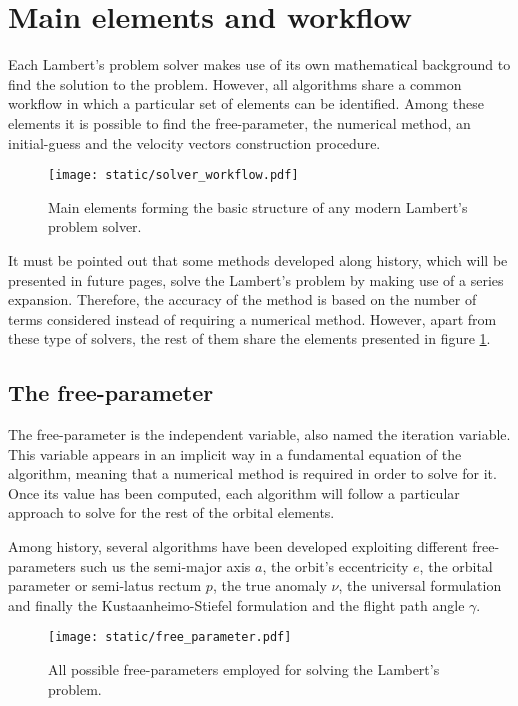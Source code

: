 \section{Main elements and workflow}

Each Lambert's problem solver makes use of its own mathematical background to
find the solution to the problem. However, all algorithms share a common
workflow in which a particular set of elements can be identified. Among these
elements it is possible to find the free-parameter, the numerical method, an
initial-guess and the velocity vectors construction procedure.

\vspace{0.5cm}
\begin{figure}[h]
  \centering
  \texttt{[image: static/solver\_workflow.pdf]}
  \caption{Main elements forming the basic structure of any modern Lambert's
    problem solver.}
  \label{fig:solver_elements}
\end{figure}

It must be pointed out that some methods developed along history, which will be
presented in future pages, solve the Lambert's problem by making use of a series
expansion. Therefore, the accuracy of the method is based on the number of
terms considered instead of requiring a numerical method. However, apart from
these type of solvers, the rest of them share the elements presented in figure
\ref{fig:solver_elements}.

\subsection{The free-parameter}

The free-parameter is the independent variable, also named the iteration
variable. This variable appears in an implicit way in a fundamental equation of
the algorithm, meaning that a numerical method is required in order to solve for
it. Once its value has been computed, each algorithm will follow a particular
approach to solve for the rest of the orbital elements.

Among history, several algorithms have been developed exploiting different
free-parameters such us the semi-major axis $a$, the orbit's eccentricity $e$,
the orbital parameter or semi-latus rectum $p$, the true anomaly $\nu$, the
universal formulation and finally the Kustaanheimo-Stiefel formulation and the
flight path angle $\gamma$.

\vspace{0.5cm}
\begin{figure}[h]
  \centering
  \texttt{[image: static/free\_parameter.pdf]}
  \caption{All possible free-parameters employed for solving the Lambert's problem.}
  \label{fig:free_parameter}
\end{figure}


